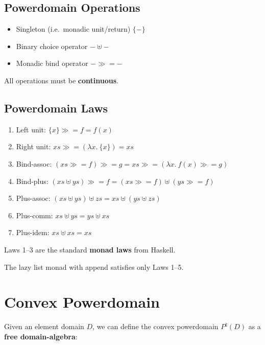 \documentclass[portrait]{sciposter}
\begin{document}
\begin{multicols}{3}
\subsection*{Powerdomain Operations}
\begin{sectionbox}{}
\begin{itemize}
\item Singleton (i.e.~monadic unit/return) $\{-\}$
\item Binary choice operator $-\uplus-$
\item Monadic bind operator $- \gg\!\!= -$
\end{itemize}
\end{sectionbox}

All operations must be \textbf{continuous}.

\columnbreak

\subsection*{Powerdomain Laws}
\begin{sectionbox}{}
\begin{enumerate}
\item Left unit: $\{x\} \gg\!\!= f = f(x)$
\item Right unit: $xs \gg\!\!= (\lambda x.\ \{x\}) = xs$
\item Bind-assoc: $(xs \gg\!\!= f) \gg\!\!= g = xs \gg\!\!= (\lambda x.\ f(x) \gg\!\!= g)$
\item Bind-plus: $(xs \uplus ys) \gg\!\!= f = (xs \gg\!\!= f) \uplus (ys \gg\!\!= f)$
\item Plus-assoc: $(xs \uplus ys) \uplus zs = xs \uplus (ys \uplus zs)$
\item Plus-comm: $xs \uplus ys = ys \uplus xs$
\item Plus-idem: $xs \uplus xs = xs$
\end{enumerate}
\end{sectionbox}

Laws 1--3 are the standard \textbf{monad laws} from Haskell.

The lazy list monad with append satisfies only Laws 1--5.


\section{Convex Powerdomain}
Given an element domain $D$, we can define the convex powerdomain $P^\natural(D)$ as a \textbf{free domain-algebra}:


\end{multicols}
\end{document}
